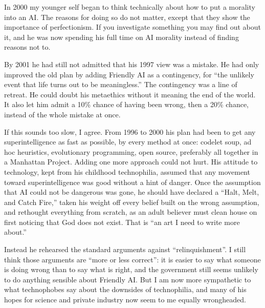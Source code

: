 
In 2000 my younger self began to think technically about how to put a morality into an AI. The reasons for doing so do not matter, except that they show the importance of perfectionism. If you investigate something you may find out about it, and he was now spending his full time on AI morality instead of finding reasons not to.

By 2001 he had still not admitted that his 1997 view was a mistake. He had only improved the old plan by adding Friendly AI as a contingency, for ``the unlikely event that life turns out to be meaningless.''  The contingency was a line of retreat. He could doubt his metaethics without it meaning the end of the world. It also let him admit a 10\% chance of having been wrong, then a 20\% chance, instead of the whole mistake at once. 

If this sounds too slow, I agree. From 1996 to 2000 his plan had been to get any superintelligence as fast as possible, by every method at once: codelet soup, ad hoc heuristics, evolutionary programming, open source, preferably all together in a Manhattan Project. Adding one more approach could not hurt. His attitude to technology, kept from his childhood technophilia, assumed that any movement toward superintelligence was good without a hint of danger. Once the assumption that AI could not be dangerous was gone, he should have declared a ``Halt, Melt, and Catch Fire,'' taken his weight off every belief built on the wrong assumption, and rethought everything from scratch, as an adult believer must clean house on first noticing that God does not exist. That is ``an art I need to write more about.'' 

Instead he rehearsed the standard arguments against ``relinquishment''.  I still think those arguments are ``more or less correct'': it is easier to say what someone is doing wrong than to say what is right, and the government still seems unlikely to do anything sensible about Friendly AI. But I am now more sympathetic to what technophobes say about the downsides of technophilia, and many of his hopes for science and private industry now seem to me equally wrongheaded.

